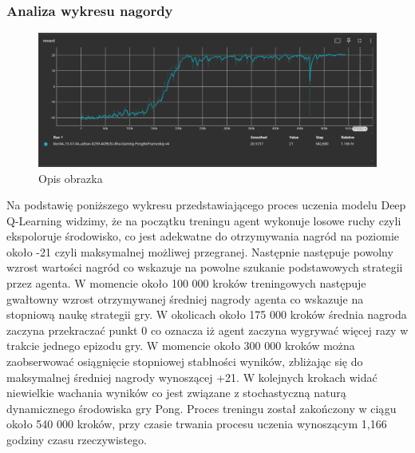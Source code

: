 \documentclass[a4paper, 12pt]{article}
\begin{document}
    \subsubsection{Analiza wykresu nagordy}
    \begin{figure}[htbp]
        \centering
        \includegraphics[width=\textwidth]{pictures/DQL_reward.png}
        \caption{Opis obrazka}
        \label{fig:etykieta_obrazka}
    \end{figure}
    Na podstawię poniższego wykresu przedstawiającego proces uczenia modelu Deep Q-Learning widzimy, że na początku treningu agent wykonuje
    losowe ruchy czyli ekspoloruje środowisko, co jest adekwatne do otrzymywania nagród na poziomie około -21 czyli maksymalnej możliwej przegranej. 
    Następnie następuje powolny wzrost wartości nagród co wskazuje na powolne szukanie podstawowych strategii przez agenta. W momencie około 100 000 
    kroków treningowych następuje gwałtowny wzrost otrzymywanej średniej nagrody agenta co wskazuje na stopniową naukę strategii gry.
    W okolicach około 175 000 kroków średnia nagroda zaczyna przekraczać punkt 0 co oznacza iż agent zaczyna wygrywać więcej razy w trakcie jednego epizodu gry.
    W momencie około 300 000 kroków można zaobserwować osiągnięcie stopniowej stablności wyników, zbliżając się do maksymalnej średniej nagrody wynoszącej +21.
    W kolejnych krokach widać niewielkie wachania wyników co jest związane z stochastyczną naturą dynamicznego środowiska gry Pong.
    Proces treningu został zakończony w ciągu około 540 000 kroków, przy czasie trwania procesu uczenia wynoszącym 1,166 godziny czasu rzeczywistego.
\end{document}
